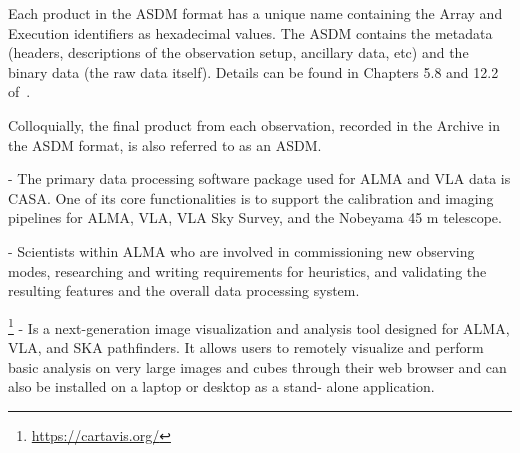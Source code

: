 \begin{description}
Each product in the ASDM format has a unique name containing the Array and Execution identifiers as hexadecimal values. The ASDM contains the metadata (headers, descriptions of the observation setup, ancillary data, etc) and the binary data (the raw data itself). Details can be found in Chapters 5.8 and 12.2 of~\cite{c12_thb}.

Colloquially, the final product from each observation, recorded in the Archive in the ASDM format, is also referred to as an ASDM.
\item[Common Astronomy Software Applications - CASA] - The primary data processing software package used for ALMA and VLA data is CASA. One of its core functionalities is to support the calibration and imaging pipelines for ALMA, VLA, VLA Sky Survey, and the Nobeyama 45 m telescope.
\item[Commissioning Scientist] - Scientists within ALMA who are involved in commissioning new observing modes, researching and writing requirements for heuristics, and validating the resulting features and the overall data processing system. %
\item[Cube Analysis and Rendering Tool for Astronomy (CARTA)]\footnote{\url{https://cartavis.org/}} - Is a next-generation image
visualization and analysis tool designed for ALMA, VLA, and SKA pathfinders. It allows users to remotely visualize and perform basic analysis on very large images and cubes through their web browser and can also be installed on a laptop or desktop as a stand-
alone application.


\end{description}
